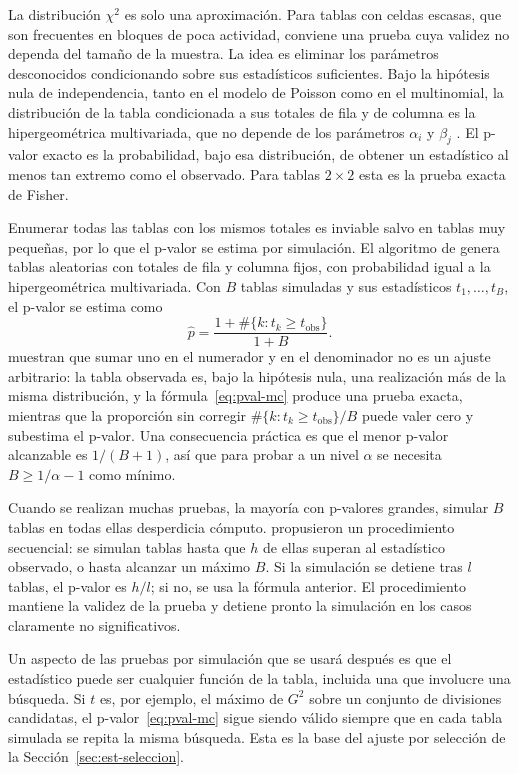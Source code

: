 La distribución $\chi^2$ es solo una aproximación. Para tablas con celdas
escasas, que son frecuentes en bloques de poca actividad, conviene una prueba cuya
validez no dependa del tamaño de la muestra. La idea es eliminar los parámetros
desconocidos condicionando sobre sus estadísticos suficientes. Bajo la hipótesis
nula de independencia, tanto en el modelo de Poisson como en el multinomial, la
distribución de la tabla condicionada a sus totales de fila y de columna es la
hipergeométrica multivariada, que no depende de los parámetros $\alpha_i$ y
$\beta_j$ \cite{Agresti2013}. El p-valor exacto es la probabilidad, bajo esa
distribución, de obtener un estadístico al menos tan extremo como el observado.
Para tablas $2 \times 2$ esta es la prueba exacta de Fisher.

Enumerar todas las tablas con los mismos totales es inviable salvo en tablas muy
pequeñas, por lo que el p-valor se estima por simulación. El algoritmo de
\cite{Patefield1981} genera tablas aleatorias con totales de fila y columna
fijos, con probabilidad igual a la hipergeométrica multivariada. Con $B$ tablas
simuladas y sus estadísticos $t_1, \dots, t_B$, el p-valor se estima como
\begin{equation}\label{eq:pval-mc}
  \hat{p} = \frac{1 + \#\{k : t_k \ge t_{\mathrm{obs}}\}}{1 + B} .
\end{equation}
\cite{Phipson2010} muestran que sumar uno en el numerador y en el denominador no
es un ajuste arbitrario: la tabla observada es, bajo la hipótesis nula, una
realización más de la misma distribución, y la fórmula~\eqref{eq:pval-mc} produce
una prueba exacta, mientras que la proporción sin corregir $\#\{k : t_k \ge
t_{\mathrm{obs}}\}/B$ puede valer cero y subestima el p-valor. Una consecuencia
práctica es que el menor p-valor alcanzable es $1/(B+1)$, así que para probar a un
nivel $\alpha$ se necesita $B \ge 1/\alpha - 1$ como mínimo.

Cuando se realizan muchas pruebas, la mayoría con p-valores grandes, simular $B$
tablas en todas ellas desperdicia cómputo. \cite{Besag1991} propusieron un
procedimiento secuencial: se simulan tablas hasta que $h$ de ellas superan al
estadístico observado, o hasta alcanzar un máximo $B$. Si la simulación se detiene
tras $l$ tablas, el p-valor es $h/l$; si no, se usa la fórmula anterior. El
procedimiento mantiene la validez de la prueba y detiene pronto la simulación en
los casos claramente no significativos.

Un aspecto de las pruebas por simulación que se usará después es que el
estadístico puede ser cualquier función de la tabla, incluida una que involucre
una búsqueda. Si $t$ es, por ejemplo, el máximo de $G^2$ sobre un conjunto de
divisiones candidatas, el p-valor~\eqref{eq:pval-mc} sigue siendo válido siempre
que en cada tabla simulada se repita la misma búsqueda. Esta es la base del ajuste
por selección de la Sección~\ref{sec:est-seleccion}.

